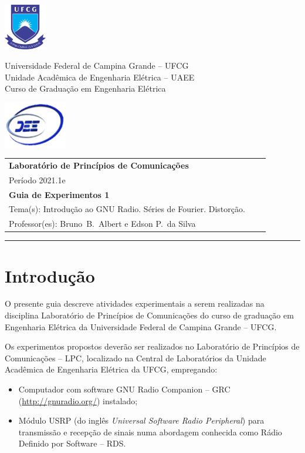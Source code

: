 \documentclass[12pt,addpoints]{exam}
\newcommand{\disciplina}{Laboratório de Princípios de Comunicações}
\newcommand{\periodo}{2021.1e}
\newcommand{\avaliacao}{Guia de Experimentos 1}
\newcommand{\tema}{Introdução ao GNU Radio. Séries de Fourier. Distorção.}
\newcommand{\professor}{Bruno\ B.\ Albert e Edson P.\ da Silva}
\begin{document}
\noindent \includegraphics[height=2cm]{../Figuras/UFCGLogo.png} \hfill
\begin{minipage}{.66\textwidth} \large \centering \vspace{-1.8cm}
    Universidade Federal de Campina Grande -- UFCG \\
    Unidade Acadêmica de Engenharia Elétrica -- UAEE \\
    Curso de Graduação em Engenharia Elétrica
\end{minipage}
\hfill \includegraphics[height=2cm]{../Figuras/DEELogo.png} \\[12pt]

\noindent
\begin{tabular*}{\textwidth}{lcr}
    \textbf{\disciplina} && \\
    Período \periodo && \\
    \textbf{\avaliacao} && \\
    Tema(s): \tema && \\
    Professor(es): \professor &&
\end{tabular*}
\noindent\rule[2ex]{\textwidth}{2pt}

\section{Introdução}

O presente guia descreve atividades experimentais a serem realizadas na disciplina Laboratório de Princípios de Comunicações do curso de graduação em Engenharia Elétrica da Universidade Federal de Campina Grande -- UFCG.

Os experimentos propostos deverão ser realizados no Laboratório de Princípios de Comunicações -- LPC, localizado na Central de Laboratórios da Unidade Acadêmica de Engenharia Elétrica da UFCG, empregando:
\begin{itemize}
    \item Computador com software GNU Radio Companion -- GRC (\url{http://gnuradio.org/}) instalado;
    \item Módulo USRP (do inglês \textit{Universal Software Radio Peripheral}) para transmissão e recepção de sinais numa abordagem conhecida como Rádio Definido por Software -- RDS.
\end{itemize}
\end{document}
